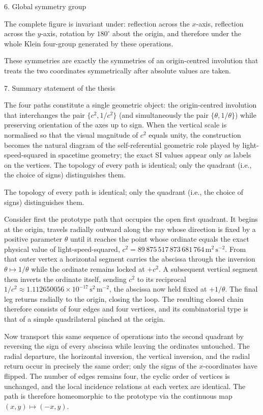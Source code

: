 6. Global symmetry group

The complete figure is invariant under:
reflection across the \(x\)-axis,
reflection across the \(y\)-axis,
rotation by \(180^\circ\) about the origin,
and therefore under the whole Klein four-group generated by these operations.

These symmetries are exactly the symmetries of an origin-centred involution that treats the two coordinates symmetrically after absolute values are taken.

7. Summary statement of the thesis

The four paths constitute a single geometric object: the origin-centred involution that interchanges the pair \(\{c^{2},1/c^{2}\}\) (and simultaneously the pair \(\{\theta,1/\theta\}\)) while preserving orientation of the axes up to sign.  
When the vertical scale is normalised so that the visual magnitude of \(c^{2}\) equals unity, the construction becomes the natural diagram of the self-referential geometric role played by light-speed-squared in spacetime geometry; the exact SI values appear only as labels on the vertices.  
The topology of every path is identical; only the quadrant (i.e., the choice of signs) distinguishes them.

The topology of every path is identical; only the quadrant (i.e., the choice of signs) distinguishes them.

Consider first the prototype path that occupies the open first quadrant. It begins at the origin, travels radially outward along the ray whose direction is fixed by a positive parameter \(\theta\) until it reaches the point whose ordinate equals the exact physical value of light-speed-squared, \(c^{2}=89\,875\,517\,873\,681\,764\,\mathrm{m^{2}\,s^{-2}}\). From that outer vertex a horizontal segment carries the abscissa through the inversion \(\theta\mapsto 1/\theta\) while the ordinate remains locked at \(+c^{2}\). A subsequent vertical segment then inverts the ordinate itself, sending \(c^{2}\) to its reciprocal \(1/c^{2}\approx 1.112650056\times 10^{-17}\,\mathrm{s^{2}\,m^{-2}}\), the abscissa now held fixed at \(+1/\theta\). The final leg returns radially to the origin, closing the loop. The resulting closed chain therefore consists of four edges and four vertices, and its combinatorial type is that of a simple quadrilateral pinched at the origin.

Now transport this same sequence of operations into the second quadrant by reversing the sign of every abscissa while leaving the ordinates untouched. The radial departure, the horizontal inversion, the vertical inversion, and the radial return occur in precisely the same order; only the signs of the \(x\)-coordinates have flipped. The number of edges remains four, the cyclic order of vertices is unchanged, and the local incidence relations at each vertex are identical. The path is therefore homeomorphic to the prototype via the continuous map \((x,y)\mapsto(-x,y)\).

